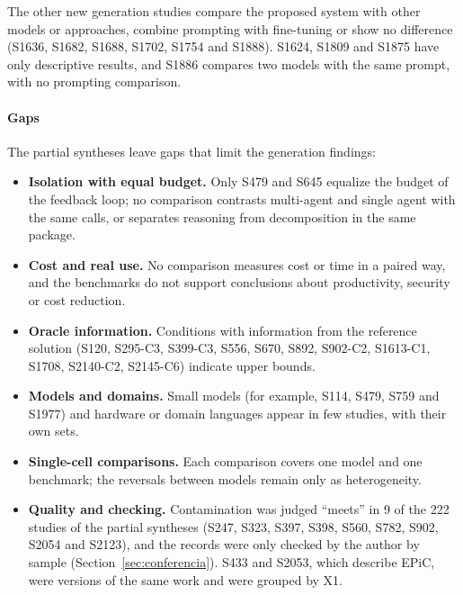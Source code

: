 The other new generation studies compare the proposed system with other models or approaches, combine prompting
with fine-tuning or show no difference (S1636, S1682, S1688, S1702, S1754 and S1888). S1624, S1809 and S1875 have only
descriptive results, and S1886 compares two models with the same prompt, with no prompting comparison.

\paragraph{Gaps}
The partial syntheses leave gaps that limit the generation findings:
\begin{itemize}
\item \textbf{Isolation with equal budget.} Only S479 and S645 equalize the budget of the feedback loop; no comparison contrasts multi-agent and single agent with the same calls, or separates reasoning from decomposition in the same package.
\item \textbf{Cost and real use.} No comparison measures cost or time in a paired way, and the benchmarks do not support conclusions about productivity, security or cost reduction.
\item \textbf{Oracle information.} Conditions with information from the reference solution (S120, S295-C3, S399-C3, S556, S670, S892, S902-C2, S1613-C1, S1708, S2140-C2, S2145-C6) indicate upper bounds.
\item \textbf{Models and domains.} Small models (for example, S114, S479, S759 and S1977) and hardware or domain languages appear in few studies, with their own sets.
\item \textbf{Single-cell comparisons.} Each comparison covers one model and one benchmark; the reversals between models remain only as heterogeneity.
\item \textbf{Quality and checking.} Contamination was judged ``meets'' in 9 of the 222 studies of the partial syntheses (S247, S323, S397, S398, S560, S782, S902, S2054 and S2123), and the records were only checked by the
author by sample (Section~\ref{sec:conferencia}). S433 and S2053, which describe EPiC, were versions of the same work and were grouped by X1.
\end{itemize}
